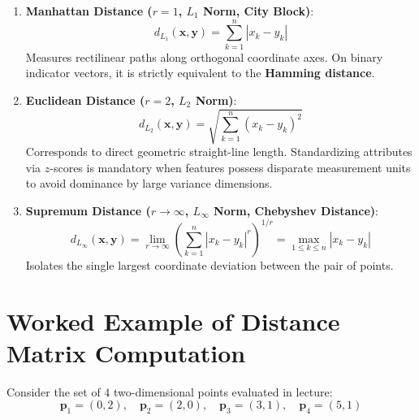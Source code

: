 \begin{enumerate}
    \item \textbf{Manhattan Distance ($r = 1$, $L_1$ Norm, City Block)}:
    \begin{equation}
        d_{L_1}(\mathbf{x}, \mathbf{y}) = \sum_{k=1}^n |x_k - y_k|
    \end{equation}
    Measures rectilinear paths along orthogonal coordinate axes. On binary indicator vectors, it is strictly equivalent to the \textbf{Hamming distance}.
    \item \textbf{Euclidean Distance ($r = 2$, $L_2$ Norm)}:
    \begin{equation}
        d_{L_2}(\mathbf{x}, \mathbf{y}) = \sqrt{\sum_{k=1}^n (x_k - y_k)^2}
    \end{equation}
    Corresponds to direct geometric straight-line length. Standardizing attributes via $z$-scores is mandatory when features possess disparate measurement units to avoid dominance by large variance dimensions.
    \item \textbf{Supremum Distance ($r \to \infty$, $L_\infty$ Norm, Chebyshev Distance)}:
    \begin{equation}
        d_{L_\infty}(\mathbf{x}, \mathbf{y}) = \lim_{r \to \infty} \left( \sum_{k=1}^n |x_k - y_k|^r \right)^{1/r} = \max_{1 \le k \le n} |x_k - y_k|
    \end{equation}
    Isolates the single largest coordinate deviation between the pair of points.
\end{enumerate}

\section{Worked Example of Distance Matrix Computation}
\label{sec:dm-distance-matrix-example}

Consider the set of $4$ two-dimensional points evaluated in lecture:
\begin{equation}
    \mathbf{p}_1 = (0, 2), \quad \mathbf{p}_2 = (2, 0), \quad \mathbf{p}_3 = (3, 1), \quad \mathbf{p}_4 = (5, 1)
\end{equation}

